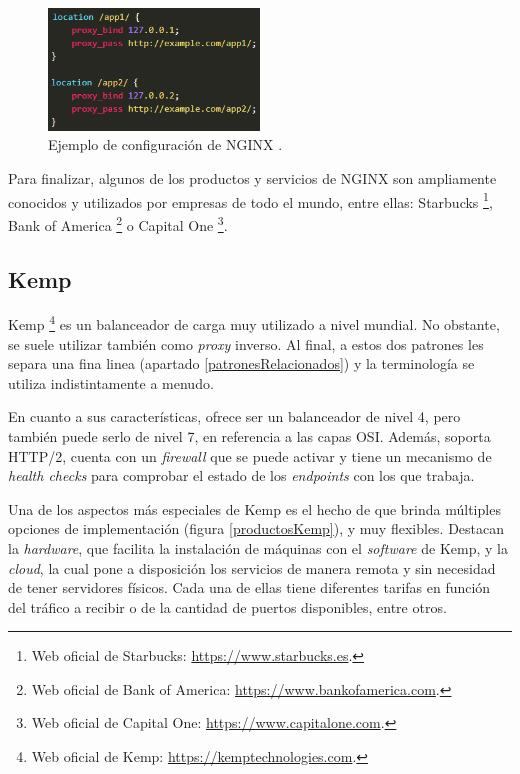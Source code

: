 \documentclass[11pt,spanish,listoffigures]{tfgetsinf}
\begin{document}
\begin{figure}[ht]
\centering
\includegraphics[width=0.5\textwidth]{imagenes/configuracionNGINX}
\caption[Ejemplo de configuración de NGINX.]{Ejemplo de configuración de NGINX \cite{NGINX_documentacion}.}
	\label{configuracionNGINX}
\end{figure}

Para finalizar, algunos de los productos y servicios de NGINX son ampliamente conocidos y utilizados por empresas de todo el mundo, entre ellas: Starbucks \footnote{Web oficial de Starbucks: \url{https://www.starbucks.es}.}, Bank of America \footnote{Web oficial de Bank of America: \url{https://www.bankofamerica.com}.} o Capital One \footnote{Web oficial de Capital One: \url{https://www.capitalone.com}.}.


		\subsection{Kemp}

Kemp \footnote{Web oficial de Kemp: \url{https://kemptechnologies.com}.} es un balanceador de carga muy utilizado a nivel mundial. No obstante, se suele utilizar también como \emph{proxy} inverso. Al final, a estos dos patrones les separa una fina linea (apartado \ref{patronesRelacionados}) y la terminología se utiliza indistintamente a menudo.

En cuanto a sus características, ofrece ser un balanceador de nivel 4, pero también puede serlo de nivel 7, en referencia a las capas OSI. Además, soporta HTTP/2, cuenta con un \emph{firewall} que se puede activar y tiene un mecanismo de \emph{health checks} para comprobar el estado de los \emph{endpoints} con los que trabaja.

Una de los aspectos más especiales de Kemp es el hecho de que brinda múltiples opciones de implementación (figura \ref{productosKemp}), y muy flexibles. Destacan la \emph{hardware}, que facilita la instalación de máquinas con el \emph{software} de Kemp, y la \emph{cloud}, la cual pone a disposición los servicios de manera remota y sin necesidad de tener servidores físicos. Cada una de ellas tiene diferentes tarifas en función del tráfico a recibir o de la cantidad de puertos disponibles, entre otros.
\end{document}
